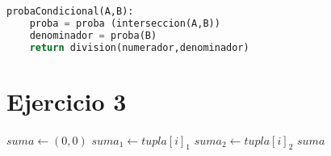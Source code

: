 \documentclass{article}
\begin{document}
\begin{lstlisting}[language=python]
probaCondicional(A,B):
    proba = proba (interseccion(A,B))
    denominador = proba(B)
    return division(numerador,denominador)
\end{lstlisting}





\section*{Ejercicio 3}

\begin{algorithmic}
    \State $suma \leftarrow (0,0)$
            \State $suma_1 \leftarrow tupla[i]_1$
            \State $suma_2 \leftarrow tupla[i]_2$
        \EndFor
    \EndIf
    \State \Return $suma$
\EndFunction
\end{algorithmic}
\end{document}
